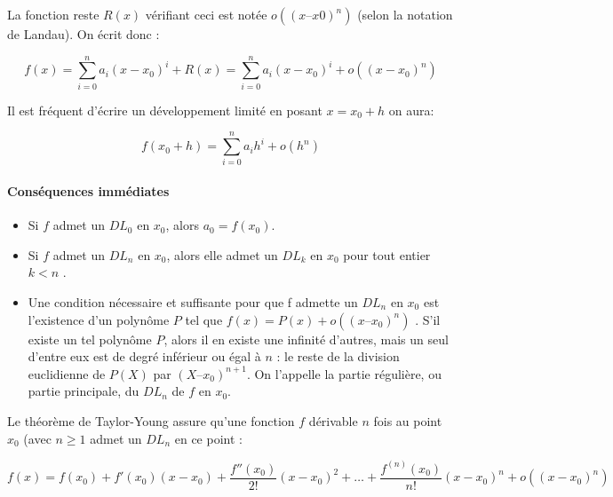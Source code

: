 La fonction reste $R(x)$ vérifiant ceci est notée $o((x – x0)^n)$ (selon la notation de Landau). On écrit donc :

$$
f(x)= \sum _{i=0}^{n}a_{i}(x-x_{0})^{i}+R(x) =\sum _{{i=0}}^{n}a_{i}(x-x_{0})^{i}+o((x-x_{0})^{n})
$$


Il est fréquent d'écrire un développement limité en posant $x = x_0 + h$ on aura:

\begin{equation}\label{eq:dev_lim_h}
f(x_{0}+h)=\sum _{{i=0}}^{n}a_{i}h^{i}+o(h^{n})
\end{equation}


\paragraph*{Conséquences immédiates}
\begin{itemize}
	\item Si $f$ admet un $DL_0$ en $x_0$, alors $a_0 = f(x_0)$. \cite{coulombeau2013math}
	\item Si $f$ admet un $DL_n$ en $x_0$, alors elle admet un $DL_k$ en $x_0$ pour tout entier $k < n$ \cite{coulombeau2013math}.
	\item Une condition nécessaire et suffisante pour que f admette un $DL_n$ en $x_0$ est l'existence d'un polynôme $P$ tel que $f(x) = P(x) + o((x – x_0)^n)$ \cite{coulombeau2013math}. S'il existe un tel polynôme $P$, alors il en existe une infinité d'autres, mais un seul d'entre eux est de degré inférieur ou égal à $n$ : le reste de la division euclidienne de $P(X)$ par $(X – x_0)^{n+1}$. On l'appelle la partie régulière, ou partie principale, du $DL_n$ de $f$ en $x_0$. %
\end{itemize}



Le théorème de Taylor-Young assure \cite{coulombeau2013math} qu'une fonction $f$ dérivable $n$ fois au point $x_0$ (avec ${\displaystyle n\geq 1}$ admet un $DL_n$ en ce point :

$$
{\displaystyle f(x)=f(x_{0})+f'(x_{0})(x-x_{0})+{\frac {f''(x_{0})}{2!}}(x-x_{0})^{2}+\dots +{\frac {f^{(n)}(x_{0})}{n!}}(x-x_{0})^{n}+o((x-x_{0})^{n})}
$$

